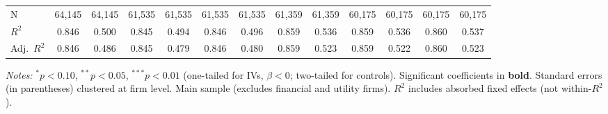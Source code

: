 \begin{landscape}
\begin{table}[H]
\begin{tabular}{lcccccccccccc}
\midrule
N & 64,145 & 64,145 & 61,535 & 61,535 & 61,535 & 61,535 & 61,359 & 61,359 & 60,175 & 60,175 & 60,175 & 60,175 \\
$R^2$ & 0.846 & 0.500 & 0.845 & 0.494 & 0.846 & 0.496 & 0.859 & 0.536 & 0.859 & 0.536 & 0.860 & 0.537 \\
Adj.~$R^2$ & 0.846 & 0.486 & 0.845 & 0.479 & 0.846 & 0.480 & 0.859 & 0.523 & 0.859 & 0.522 & 0.860 & 0.523 \\
\bottomrule
\end{tabular}
\begin{minipage}{\linewidth}
\vspace{2pt}\scriptsize
\textit{Notes:} $^{*}p<0.10$, $^{**}p<0.05$, $^{***}p<0.01$ (one-tailed for IVs, $\beta < 0$; two-tailed for controls).
 Significant coefficients in \textbf{bold}.
 Standard errors (in parentheses) clustered at firm level.
 Main sample (excludes financial and utility firms).
 $R^2$ includes absorbed fixed effects (not within-$R^2$).
\end{minipage}
\end{table}
\end{landscape}